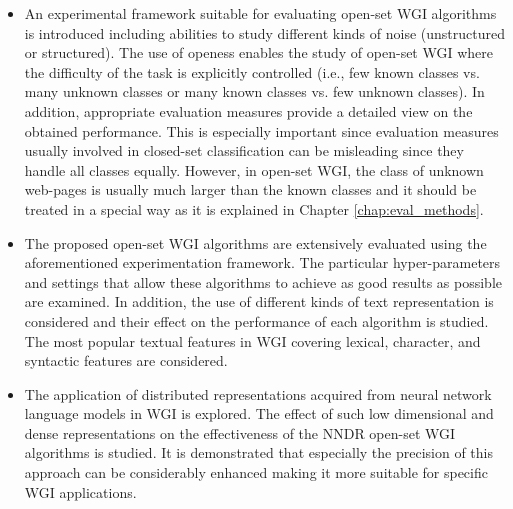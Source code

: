 \begin{itemize}
\item An experimental framework suitable for evaluating open-set WGI algorithms is introduced including abilities to study different kinds of noise (unstructured or structured). The use of openess enables the study of open-set WGI where the difficulty of the task is explicitly controlled (i.e., few known classes vs. many unknown classes or many known classes vs. few unknown classes). In addition, appropriate evaluation measures provide a detailed view on the obtained performance. This is especially important since evaluation measures usually involved in closed-set classification can be misleading since they handle all classes equally. However, in open-set WGI, the class of unknown web-pages is usually much larger than the known classes and it should be treated in a special way as it is explained in Chapter \ref{chap:eval_methods}. 
\item The proposed open-set WGI algorithms are extensively evaluated using the aforementioned experimentation framework. The particular hyper-parameters and settings that allow these algorithms to achieve as good results as possible are examined. In addition, the use of different kinds of text representation is considered and their effect on the performance of each algorithm is studied. The most popular textual features in WGI covering lexical, character, and syntactic features are considered.
\item The application of distributed representations acquired from neural network language models in WGI is explored. The effect of such low dimensional and dense representations on the effectiveness of the NNDR open-set WGI algorithms is studied. It is demonstrated that especially the precision of this approach can be considerably enhanced making it more suitable for specific WGI applications.


\end{itemize}

